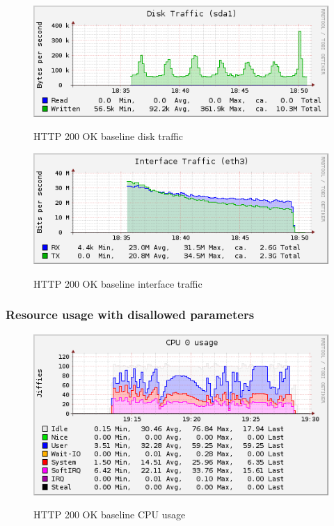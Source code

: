 \documentclass[Measurement results]{subfiles}
\begin{document}
\begin{figure}[H]
\centering
\caption{HTTP 200 OK baseline disk traffic}
\includegraphics[scale=0.7]{images/results/200_with_naxsi_incremented_allowed_parameters/disk.png}
\label{fig:Baseline Nginx disk traffic}
\end{figure}

\begin{figure}[H]
\centering
\caption{HTTP 200 OK baseline interface traffic}
\includegraphics[scale=0.7]{images/results/200_with_naxsi_incremented_allowed_parameters/interface.png}
\label{fig:Baseline Nginx interface traffic}
\end{figure}

\subsubsection{Resource usage with disallowed parameters}
\begin{figure}[H]
\centering
\caption{HTTP 200 OK baseline CPU usage}
\includegraphics[scale=0.7]{images/results/200_with_naxsi_incremented_disallowed_parameters/cpu.png}
\label{fig:Baseline Nginx CPU usage}
\end{figure}
\end{document}
